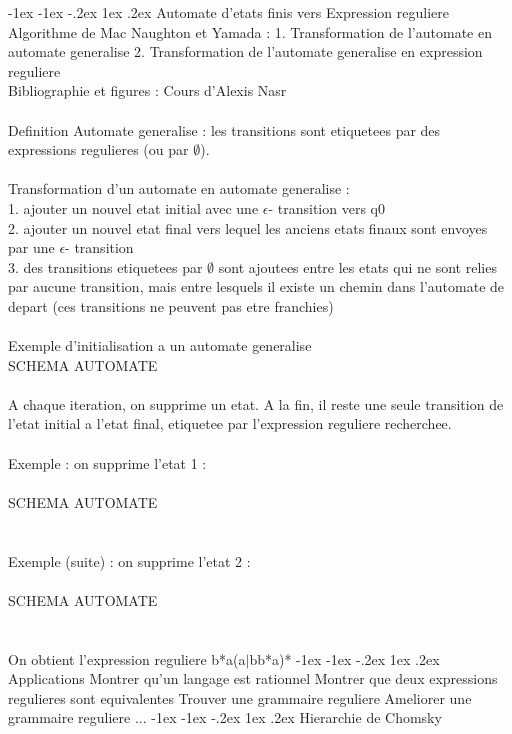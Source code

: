 \documentclass[5pt]{article}
\makeatletter
\renewcommand{\subsubsection}{\@startsection {section}{1}{\z@}%
             {-1ex \@plus -1ex \@minus -.2ex}%
             {1ex \@plus.2ex}%
             {\normalfont\scriptsize\sffamily\bfseries}}
\makeatother
\begin{document}
\begin{scriptsize}
\subsubsection{Automate d'etats finis vers Expression reguliere}
Algorithme de Mac Naughton et Yamada : 1. Transformation de l’automate en automate generalise 2. Transformation de l’automate generalise en expression reguliere\\
Bibliographie et figures : Cours d’Alexis Nasr\\
\\
Definition Automate generalise : les transitions sont etiquetees par des expressions regulieres (ou par $\emptyset$).\\
\\
Transformation d’un automate en automate generalise :\\
1. ajouter un nouvel etat initial avec une $\epsilon$- transition vers q0\\
2. ajouter un nouvel etat final vers lequel les anciens etats finaux sont envoyes par une $\epsilon$- transition\\
3. des transitions etiquetees par $\emptyset$ sont ajoutees entre les etats qui ne sont relies par aucune transition, mais entre lesquels il existe un chemin dans l’automate de depart (ces transitions ne peuvent pas etre franchies)\\
\\
Exemple d’initialisation a un automate generalise 
\\
SCHEMA AUTOMATE\\
\\
A chaque iteration, on supprime un etat. A la fin, il reste une seule transition de l’etat initial a l’etat final, etiquetee par l’expression reguliere recherchee.\\
\\
Exemple : on supprime l’etat 1 :\\
\\
SCHEMA AUTOMATE\\
\\
\\
Exemple (suite) : on supprime l’etat 2 :\\
\\
SCHEMA AUTOMATE\\
\\
\\
On obtient l’expression reguliere b*a(a$\mid$bb*a)*
\subsubsection{Applications }
Montrer qu’un langage est rationnel Montrer que deux expressions regulieres sont equivalentes Trouver une grammaire reguliere Ameliorer une grammaire reguliere ...
\subsubsection{Hierarchie de Chomsky}
\end{scriptsize}
\end{document}

